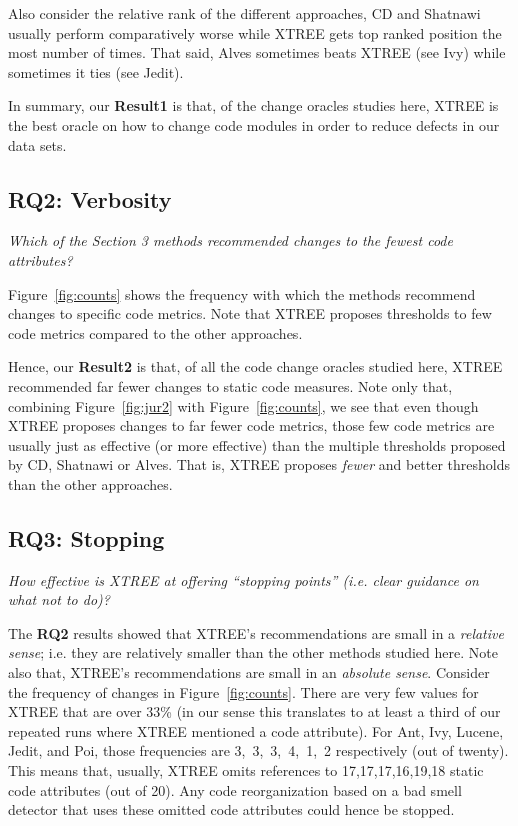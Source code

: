 \documentclass[twocolumn,5p]{elsarticle}
\newcommand{\fig}[1]{Figure~\ref{fig:#1}}
\theoremstyle{break}
\begin{document}
	Also consider the relative
	rank of the different approaches,
	CD and Shatnawi usually  perform comparatively worse while  XTREE gets top 
	ranked position the most
	number of times. That said, Alves sometimes beats XTREE (see Ivy)
	while sometimes it ties (see Jedit).
	
	In summary, our {\bf Result1} is  that, of the change oracles studies here,
	XTREE is the best oracle on how to change code modules in order to reduce 
	defects in our data sets.
	
	
	
	\subsection{RQ2: Verbosity}
	
	{\em Which of the Section 3 methods recommended changes to the fewest code 
	attributes?}
	
	\fig{counts} shows the frequency with which the methods
	recommend changes to specific code metrics.
	Note that XTREE proposes thresholds to
	few code metrics compared to the other approaches.
	
	
	Hence, our {\bf Result2} is that, of all the code change oracles 
	studied here, XTREE recommended far fewer changes to static code 
	measures. Note only that,   combining  \fig{jur2} with \fig{counts}, 
	we   see that
	even though XTREE proposes changes to far fewer code metrics, those few
	code metrics are usually just as effective (or
	more effective) than the multiple
	thresholds
	proposed by CD, Shatnawi or Alves.  That is, XTREE proposes
	{\em fewer} and better thresholds than the other approaches.
	
	
	
	\subsection{RQ3: Stopping}
	
	{\em  How effective is XTREE at offering   ``stopping points'' (i.e. clear 
	guidance on what not to do)?}
	
	The {\bf RQ2} results showed that XTREE's recommendations are small in a 
	{\em relative sense}; i.e. they are
	relatively smaller than the other methods studied here.
	Note also that, XTREE's recommendations are small in an {\em absolute 
	sense}.
	Consider the frequency of changes in \fig{counts}. There are very few 
	values for XTREE that are over 33\% (in our sense this translates to at 
	least a third of our repeated runs where XTREE mentioned a code 
	attribute). 
	For Ant, Ivy, Lucene, Jedit, and Poi, those frequencies
	are  \mbox{3, 3, 3, 4, 1, 2} respectively (out of twenty). This means 
	that, 
	usually, XTREE omits references to \mbox{17,17,17,16,19,18} static code 
	attributes (out of 20). Any code reorganization based on a bad smell 
	detector that uses  these omitted code attributes could hence  be stopped.
	
\end{document}

